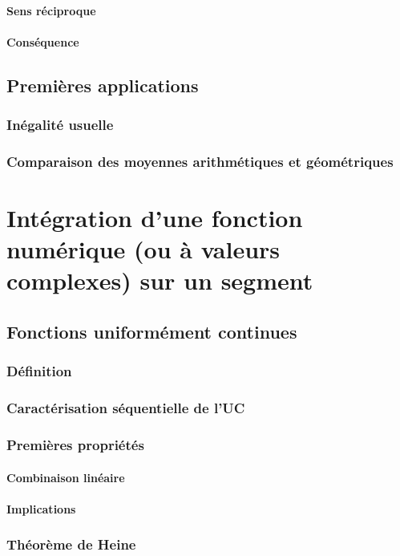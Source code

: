 \documentclass[12pt,a4paper,french]{book}
\begin{document}
			\subsubsection{Sens réciproque}
			\subsubsection{Conséquence}
	\section{Premières applications}
		\subsection{Inégalité usuelle}
		\subsection{Comparaison des moyennes arithmétiques et géométriques}
		
\chapter{Intégration d'une fonction numérique (ou à valeurs complexes) sur un segment}
	\section{Fonctions uniformément continues}
		\subsection{Définition}
		\subsection{Caractérisation séquentielle de l'UC}
		\subsection{Premières propriétés}
			\subsubsection{Combinaison linéaire}
			\subsubsection{Implications}
		\subsection{Théorème de Heine}
\end{document}
